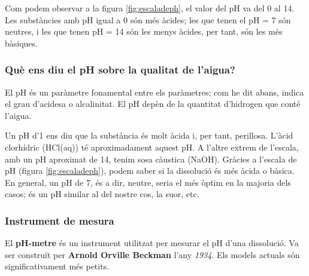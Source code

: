 Com podem observar a la figura \ref{fig:escaladeph}, el valor del pH va del 0 al 14. Les substàncies amb pH igual a 0 són més àcides; les que tenen el pH = 7 són neutres, i les que tenen pH = 14 són les menys àcides, per tant, són les més bàsiques.


\subsubsection{Què ens diu el pH sobre la qualitat de l'aigua?}
El pH és un paràmetre fonamental entre els paràmetres; com he dit abans, indica el grau d'acidesa o alcalinitat. El pH depèn de la quantitat d'hidrogen que conté l'aigua.

Un pH d'1 ens diu que la substància és molt àcida i, per tant, perillosa. L'àcid clorhídric (HCl(aq)) té aproximadament aquest pH. A l'altre extrem de l'escala, amb un pH aproximat de 14, tenim sosa càustica (NaOH). Gràcies a l'escala de pH (figura \ref{fig:escaladeph}), podem saber si la dissolució és més àcida o bàsica. En general, un pH de 7, és a dir, neutre, seria el més òptim en la majoria dels casos; és un pH similar al del nostre cos, la suor, etc.


\subsubsection{Instrument de mesura}
El \textbf{pH-metre} és un instrument utilitzat per mesurar el pH d’una dissolució. Va ser construït per \textbf{Arnold Orville Beckman} l’any \textit{1934}. Els models actuals són significativament més petits.

